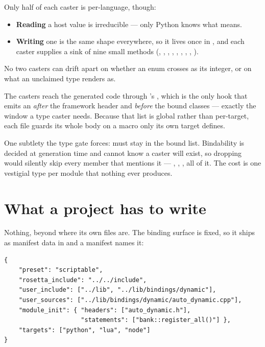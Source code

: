 Only half of each caster is per-language, though:

\begin{itemize}
  \item \textbf{Reading} a host value is irreducible --- only Python knows what
     means.
  \item \textbf{Writing} one is the same shape everywhere, so it lives once in
    , and each caster supplies a sink of nine
    small methods (, , ,
    , , , ,
    , ).
\end{itemize}

No two casters can drift apart on whether an enum crosses as its integer, or on
what an unclaimed type renders as.

The casters reach the generated code through 's
, which is the only hook that emits an 
\emph{after} the framework header and \emph{before} the bound classes --- exactly
the window a type caster needs. Because that list is global rather than
per-target, each file guards its whole body on a macro only its own target
defines.

\begin{warn}
One subtlety the type gate forces:  must stay in the bound
 list. Bindability is decided at generation time and cannot know
a caster will exist, so dropping  would silently skip every member
that mentions it --- , ,
, all of it. The cost is one vestigial  type
per module that nothing ever produces.
\end{warn}

\section{What a project has to write}

Nothing, beyond where its own files are. The binding surface is fixed, so it
ships as manifest data in  and a
manifest names it:

\begin{lstlisting}[style=json]
{
    "preset": "scriptable",
    "rosetta_include": "../../include",
    "user_include": ["../lib", "../lib/bindings/dynamic"],
    "user_sources": ["../lib/bindings/dynamic/auto_dynamic.cpp"],
    "module_init": { "headers": ["auto_dynamic.h"],
                     "statements": ["bank::register_all()"] },
    "targets": ["python", "lua", "node"]
}
\end{lstlisting}

